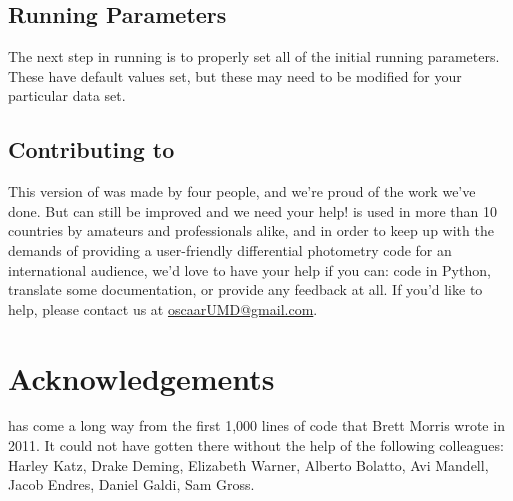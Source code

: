 \documentclass{article}
\begin{document}
\subsection{Running Parameters}
The next step in running \oscaar is to properly set all of the initial running parameters. These have default values set, but these may need to be modified for your particular data set.




\subsection{Contributing to \oscaar}
This version of \oscaar was made by four people, and we're proud of the work we've done. But \oscaar can still be improved and we need your help! \oscaar is used in more than 10 countries by amateurs and professionals alike, and in order to keep up with the demands of providing a user-friendly differential photometry code for an international audience, we'd love to have your help if you can: code in Python, translate some documentation, or provide any feedback at all. If you'd like to help, please contact us at \href{mailto:oscaarUMD@gmail.com}{oscaarUMD@gmail.com}. 




\section{Acknowledgements}
\oscaar has come a long way from the first 1,000 lines of code that Brett Morris wrote in 2011. It could not have gotten there without the help of the following colleagues: 
Harley Katz, Drake Deming, Elizabeth Warner, Alberto Bolatto, Avi Mandell, Jacob Endres, Daniel Galdi, Sam Gross.

	
\end{document}
